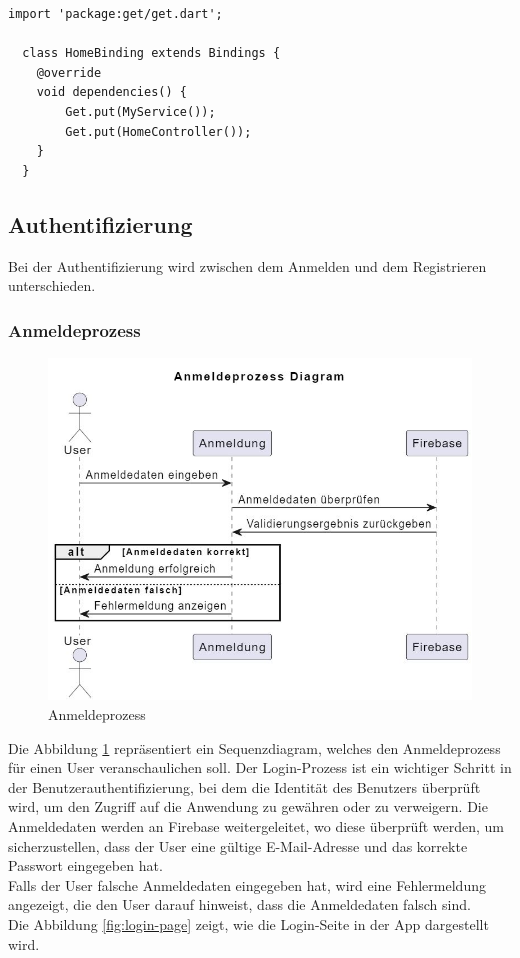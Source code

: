 \begin{lstlisting}[caption=Beispiel von einem Binding,label=lst:GetxBindingExample]
  import 'package:get/get.dart';

  class HomeBinding extends Bindings {
    @override
    void dependencies() {
        Get.put(MyService());
        Get.put(HomeController());
    }
  }

\end{lstlisting}
\newpage
\subsection{Authentifizierung}

Bei der Authentifizierung wird zwischen dem Anmelden und dem Registrieren unterschieden.

\subsubsection{Anmeldeprozess}

\begin{figure}[H]
  \centering
  \includegraphics[width=\textwidth]{pics/login-sequence.JPG}
  \caption{Anmeldeprozess}
  \label{fig:login-sequenze}
\end{figure}

Die Abbildung \ref{fig:login-sequenze} repräsentiert ein Sequenzdiagram, welches den Anmeldeprozess für einen User veranschaulichen soll. Der Login-Prozess ist ein wichtiger Schritt in der Benutzerauthentifizierung, bei dem die Identität des Benutzers überprüft wird, um den Zugriff auf die Anwendung zu gewähren oder zu verweigern. Die Anmeldedaten werden an Firebase weitergeleitet, wo diese überprüft werden, um sicherzustellen, dass der User eine gültige E-Mail-Adresse und das korrekte Passwort eingegeben hat.
\\
Falls der User falsche Anmeldedaten eingegeben hat, wird eine Fehlermeldung angezeigt, die den User darauf hinweist, dass die Anmeldedaten falsch sind.
\\
Die Abbildung \ref{fig:login-page} zeigt, wie die Login-Seite in der App dargestellt wird.

